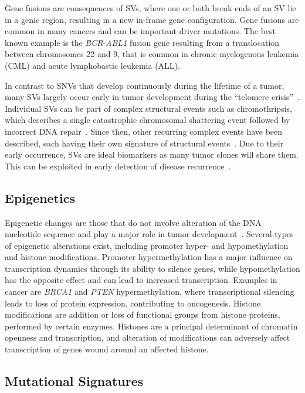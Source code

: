 \documentclass[11pt]{book}
\begin{document}
Gene fusions are consequences of SVs, where one or both break ends of an SV lie in a genic region, resulting in a new in-frame gene configuration. Gene fusions are common in many cancers and can be important driver mutations. The best known example is the \textit{BCR}-\textit{ABL1} fusion gene resulting from a translocation between chromosomes 22 and 9, that is common in chronic myelogenous leukemia (CML) and acute lymphobastic leukemia (ALL).

In contrast to SNVs that develop continuously during the lifetime of a tumor, many SVs largely occur early in tumor development during the ``telomere crisis''~\cite{Alkner:2015, Tang:2015}. Individual SVs can be part of complex structural events such as chromothripsis, which describes a single catastrophic chromosomal shattering event followed by incorrect DNA repair~\cite{Stephens:2011}. Since then, other recurring complex events have been described, each having their own signature of structural events~\cite{Nik-Zainal:2012b, Baca:2013, Hadi:2020}. Due to their early occurrence, SVs are ideal biomarkers as many tumor clones will share them. This can be exploited in early detection of disease recurrence~\cite{Olsson:2015}.


\subsection{Epigenetics}

Epigenetic changes are those that do not involve alteration of the DNA nucleotide sequence and play a major role in tumor development~\cite{DawsonKouzarides:2012}. Several types of epigenetic alterations exist, including promoter hyper- and hypomethylation and histone modifications. Promoter hypermethylation has a major influence on transcription dynamics through its ability to silence genes, while hypomethylation has the opposite effect and can lead to increased transcription. Examples in cancer are \textit{BRCA1} and \textit{PTEN} hypermethylation, where transcriptional silencing leads to loss of protein expression, contributing to oncogenesis. Histone modifications are addition or loss of functional groups from histone proteins, performed by certain enzymes. Histones are a principal determinant of chromatin openness and transcription, and alteration of modifications can adversely affect transcription of genes wound around an affected histone.


\subsection{Mutational Signatures}
\end{document}
